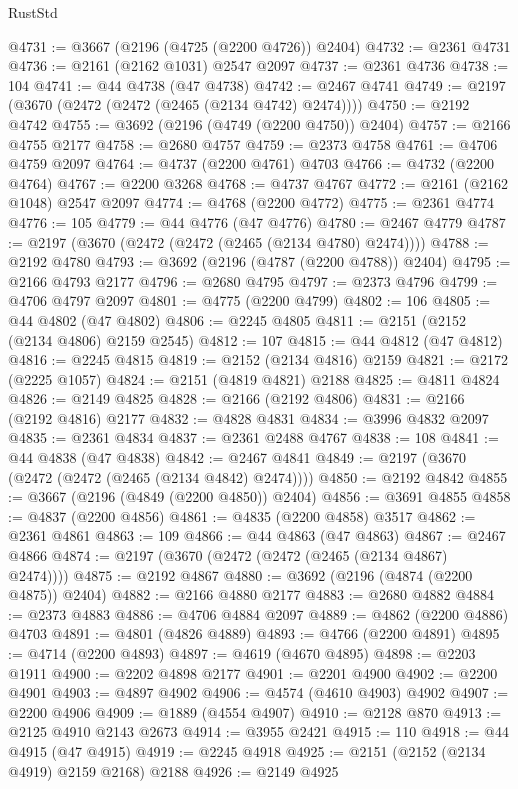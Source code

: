 \begin{lexlean}{RustStd}
\begin{coremodule}
@4731 := @3667 (@2196 (@4725 (@2200 @4726)) @2404)
@4732 := @2361 @4731
@4736 := @2161 (@2162 @1031) @2547 @2097
@4737 := @2361 @4736
@4738 := 104
@4741 := @44 @4738 (@47 @4738)
@4742 := @2467 @4741
@4749 := @2197 (@3670 (@2472 (@2472 (@2465 (@2134 @4742) @2474))))
@4750 := @2192 @4742
@4755 := @3692 (@2196 (@4749 (@2200 @4750)) @2404)
@4757 := @2166 @4755 @2177
@4758 := @2680 @4757
@4759 := @2373 @4758
@4761 := @4706 @4759 @2097
@4764 := @4737 (@2200 @4761) @4703
@4766 := @4732 (@2200 @4764)
@4767 := @2200 @3268
@4768 := @4737 @4767
@4772 := @2161 (@2162 @1048) @2547 @2097
@4774 := @4768 (@2200 @4772)
@4775 := @2361 @4774
@4776 := 105
@4779 := @44 @4776 (@47 @4776)
@4780 := @2467 @4779
@4787 := @2197 (@3670 (@2472 (@2472 (@2465 (@2134 @4780) @2474))))
@4788 := @2192 @4780
@4793 := @3692 (@2196 (@4787 (@2200 @4788)) @2404)
@4795 := @2166 @4793 @2177
@4796 := @2680 @4795
@4797 := @2373 @4796
@4799 := @4706 @4797 @2097
@4801 := @4775 (@2200 @4799)
@4802 := 106
@4805 := @44 @4802 (@47 @4802)
@4806 := @2245 @4805
@4811 := @2151 (@2152 (@2134 @4806) @2159 @2545)
@4812 := 107
@4815 := @44 @4812 (@47 @4812)
@4816 := @2245 @4815
@4819 := @2152 (@2134 @4816) @2159
@4821 := @2172 (@2225 @1057)
@4824 := @2151 (@4819 @4821) @2188
@4825 := @4811 @4824
@4826 := @2149 @4825
@4828 := @2166 (@2192 @4806)
@4831 := @2166 (@2192 @4816) @2177
@4832 := @4828 @4831
@4834 := @3996 @4832 @2097
@4835 := @2361 @4834
@4837 := @2361 @2488 @4767
@4838 := 108
@4841 := @44 @4838 (@47 @4838)
@4842 := @2467 @4841
@4849 := @2197 (@3670 (@2472 (@2472 (@2465 (@2134 @4842) @2474))))
@4850 := @2192 @4842
@4855 := @3667 (@2196 (@4849 (@2200 @4850)) @2404)
@4856 := @3691 @4855
@4858 := @4837 (@2200 @4856)
@4861 := @4835 (@2200 @4858) @3517
@4862 := @2361 @4861
@4863 := 109
@4866 := @44 @4863 (@47 @4863)
@4867 := @2467 @4866
@4874 := @2197 (@3670 (@2472 (@2472 (@2465 (@2134 @4867) @2474))))
@4875 := @2192 @4867
@4880 := @3692 (@2196 (@4874 (@2200 @4875)) @2404)
@4882 := @2166 @4880 @2177
@4883 := @2680 @4882
@4884 := @2373 @4883
@4886 := @4706 @4884 @2097
@4889 := @4862 (@2200 @4886) @4703
@4891 := @4801 (@4826 @4889)
@4893 := @4766 (@2200 @4891)
@4895 := @4714 (@2200 @4893)
@4897 := @4619 (@4670 @4895)
@4898 := @2203 @1911
@4900 := @2202 @4898 @2177
@4901 := @2201 @4900
@4902 := @2200 @4901
@4903 := @4897 @4902
@4906 := @4574 (@4610 @4903) @4902
@4907 := @2200 @4906
@4909 := @1889 (@4554 @4907)
@4910 := @2128 @870
@4913 := @2125 @4910 @2143 @2673
@4914 := @3955 @2421
@4915 := 110
@4918 := @44 @4915 (@47 @4915)
@4919 := @2245 @4918
@4925 := @2151 (@2152 (@2134 @4919) @2159 @2168) @2188
@4926 := @2149 @4925

\end{coremodule}
\end{lexlean}
